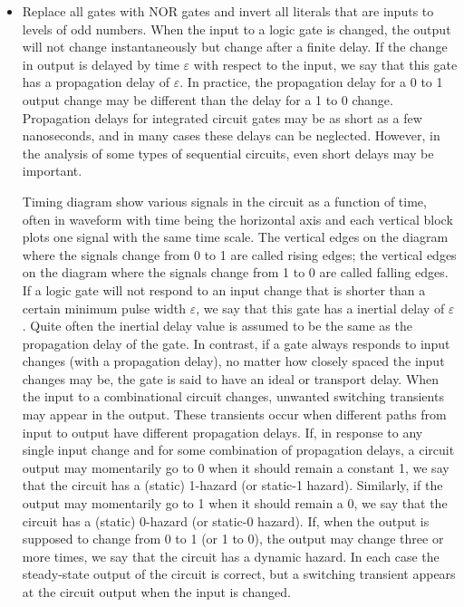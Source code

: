 \documentclass[a4paper,12pt]{article}
\begin{document}
\begin{itemize}
\begin{itemize}
\begin{itemize}
\begin{itemize}
\begin{itemize}
\begin{itemize}
\begin{itemize}
\item Replace all gates with NOR gates and invert all literals that are inputs to levels of odd numbers.
\een
{}
When the input to a logic gate is changed, the output will not change instantaneously but change after a finite delay. If the change in output is delayed by time $\varepsilon$ with respect to the input, we say that this gate has a propagation delay of $\varepsilon$. In practice, the propagation delay for a 0 to 1 output change may be different than the delay for a 1 to 0 change. Propagation delays for integrated circuit gates may be as short as a few nanoseconds, and in many cases these delays can be neglected. However, in the analysis of some types of sequential circuits, even short delays may be important.

Timing diagram show various signals in the circuit as a function of time, often in waveform with time being the horizontal axis and each vertical block plots one signal with the same time scale. The vertical edges on the diagram where the signals change from 0 to 1 are called rising edges; the vertical edges on the diagram where the signals change from 1 to 0 are called falling edges.
If a logic gate will not respond to an input change that is shorter than a certain minimum pulse width $\varepsilon$, we say that this gate has a inertial delay of $\varepsilon$. Quite often the inertial delay value is assumed to be the same as the propagation delay of the gate. In contrast, if a gate always responds to input changes (with a propagation delay), no matter how closely spaced the input changes may be, the gate is said to have an ideal or transport delay.
When the input to a combinational circuit changes, unwanted switching transients may appear in the output. These transients occur when different paths from input to output have different propagation delays. If, in response to any single input change and for some combination of propagation delays, a circuit output may momentarily go to 0 when it should remain a constant 1, we say that the circuit has a (static) 1-hazard (or static-1 hazard). Similarly, if the output may momentarily go to 1 when it should remain a 0, we say that the circuit has a (static) 0-hazard (or static-0 hazard). If, when the output is supposed to change from 0 to 1 (or 1 to 0), the output may change three or more times, we say that the circuit has a dynamic hazard. In each case the steady-state output of the circuit is correct, but a switching transient appears at the circuit output when the input is changed.


\end{itemize}
\end{itemize}
\end{itemize}
\end{itemize}
\end{itemize}
\end{itemize}
\end{itemize}
\end{document}
